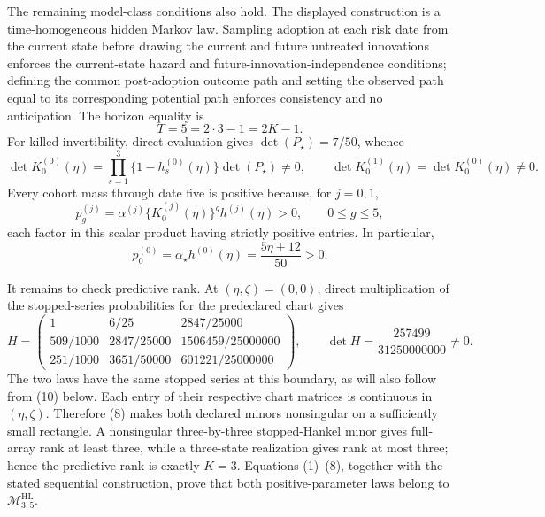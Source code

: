 The remaining model-class conditions also hold. The displayed construction is a time-homogeneous hidden Markov law. Sampling adoption at each risk date from the current state before drawing the current and future untreated innovations enforces the current-state hazard and future-innovation-independence conditions; defining the common post-adoption outcome path and setting the observed path equal to its corresponding potential path enforces consistency and no anticipation. The horizon equality is
\[
 T=5=2\cdot3-1=2K-1.                                         \tag{4}
\]
For killed invertibility, direct evaluation gives \(\det(P_{\star})=7/50\), whence
\[
 \det K_0^{(0)}(\eta)
 =\prod_{s=1}^3\{1-h_s^{(0)}(\eta)\}\det(P_{\star})\ne0,
 \qquad
 \det K_0^{(1)}(\eta)=\det K_0^{(0)}(\eta)\ne0.              \tag{5}
\]
Every cohort mass through date five is positive because, for \(j=0,1\),
\[
 p_g^{(j)}=\alpha^{(j)}\{K_0^{(j)}(\eta)\}^{g}h^{(j)}(\eta)>0,
 \qquad 0\le g\le5,                                          \tag{6}
\]
each factor in this scalar product having strictly positive entries. In particular,
\[
 p_0^{(0)}=\alpha_{\star}h^{(0)}(\eta)=\frac{5\eta+12}{50}>0. \tag{7}
\]

It remains to check predictive rank. At \((\eta,\zeta)=(0,0)\), direct multiplication of the stopped-series probabilities for the predeclared chart gives
\[
 H=
 \begin{pmatrix}
 1&6/25&2847/25000\\
 509/1000&2847/25000&1506459/25000000\\
 251/1000&3651/50000&601221/25000000
 \end{pmatrix},
 \qquad
 \det H=\frac{257499}{31250000000}\ne0.                      \tag{8}
\]
The two laws have the same stopped series at this boundary, as will also follow from (10) below. Each entry of their respective chart matrices is continuous in \((\eta,\zeta)\). Therefore (8) makes both declared minors nonsingular on a sufficiently small rectangle. A nonsingular three-by-three stopped-Hankel minor gives full-array rank at least three, while a three-state realization gives rank at most three; hence the predictive rank is exactly \(K=3\). Equations (1)--(8), together with the stated sequential construction, prove that both positive-parameter laws belong to \(\mathcal M^{\mathrm{HL}}_{3,5}\).

